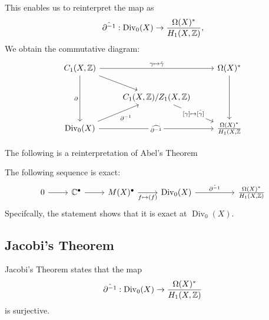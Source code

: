 \documentclass{article}
\begin{document}
{This enables us to reinterpret the map as
\[\hat{\partial^{-1}} : \operatorname{Div}_0(X) \to \frac{\Omega(X)^*}{H_1(X, \mathbb{Z})},\]
We obtain the commutative diagram:
\[\begin{tikzcd}
	{C_1(X, \Zbb)} && {\Omega(X)^*} \\
	& {C_1(X, \Zbb)/Z_1(X, \Zbb)} \\
	{\operatorname{Div}_0(X)} && {\frac{\Omega(X)^*}{H_1(X, \Zbb}}
	\arrow["{\gamma \mapsto \hat{\gamma}}", from=1-1, to=1-3]
	\arrow[from=1-1, to=2-2]
	\arrow["\partial"', from=1-1, to=3-1]
	\arrow[from=1-3, to=3-3]
	\arrow["{[\gamma] \mapsto \hat{[\gamma]}}"{description}, from=2-2, to=3-3]
	\arrow["{\partial^{-1}}"', from=3-1, to=2-2]
	\arrow["{\widehat{\partial^{-1}}}"{description}, from=3-1, to=3-3]
\end{tikzcd}\]

The following is a reinterpretation of Abel's Theorem
\begin{theorem}
    The following sequence is exact:
\[\begin{tikzcd}
	0 & {\Cbb^\bullet} & {M(X)^\bullet} & {\operatorname{Div}_0(X)} && {\frac{\Omega(X)^*}{H_1(X, \Zbb)}}
	\arrow[from=1-1, to=1-2]
	\arrow[from=1-2, to=1-3]
	\arrow["{f \mapsto (f)}"', from=1-3, to=1-4]
	\arrow["{\hat{\partial^{-1}}}", from=1-4, to=1-6]
\end{tikzcd}\]
Specifcally, the statement shows that it is exact at $\operatorname{Div}_0(X)$.
\end{theorem}

\subsection{Jacobi's Theorem}

\begin{theorem}
    Jacobi's Theorem states that the map
\[\hat{\partial^{-1}}: \operatorname{Div}_0(X) \to \frac{\Omega(X)^*}{H_1(X, \mathbb{Z})}\]
is surjective.
\end{theorem}

}
\end{document}
